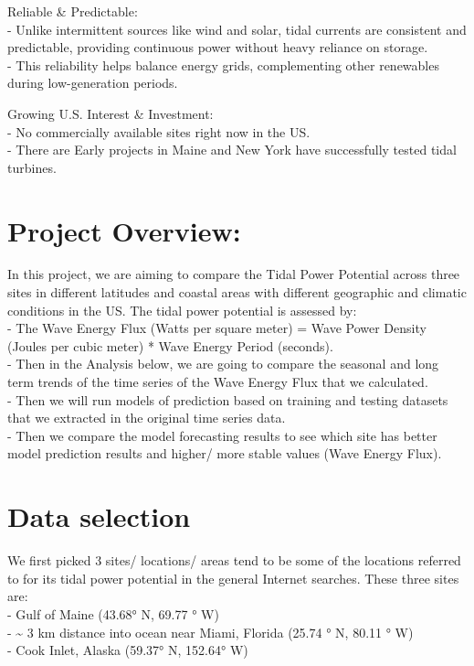 \documentclass[
]{article}
\begin{document}
Reliable \& Predictable:\\
- Unlike intermittent sources like wind and solar, tidal currents are
consistent and predictable, providing continuous power without heavy
reliance on storage.\\
- This reliability helps balance energy grids, complementing other
renewables during low-generation periods.

Growing U.S. Interest \& Investment:\\
- No commercially available sites right now in the US.\\
- There are Early projects in Maine and New York have successfully
tested tidal turbines.

\section{Project Overview:}\label{project-overview}

In this project, we are aiming to compare the Tidal Power Potential
across three sites in different latitudes and coastal areas with
different geographic and climatic conditions in the US. The tidal power
potential is assessed by:\\
- The Wave Energy Flux (Watts per square meter) = Wave Power Density
(Joules per cubic meter) * Wave Energy Period (seconds).\\
- Then in the Analysis below, we are going to compare the seasonal and
long term trends of the time series of the Wave Energy Flux that we
calculated.\\
- Then we will run models of prediction based on training and testing
datasets that we extracted in the original time series data.\\
- Then we compare the model forecasting results to see which site has
better model prediction results and higher/ more stable values (Wave
Energy Flux).

\section{Data selection}\label{data-selection}

We first picked 3 sites/ locations/ areas tend to be some of the
locations referred to for its tidal power potential in the general
Internet searches. These three sites are:\\
- Gulf of Maine (43.68° N, 69.77 ° W)\\
- \textasciitilde{} 3 km distance into ocean near Miami, Florida (25.74
° N, 80.11 ° W)\\
- Cook Inlet, Alaska (59.37° N, 152.64° W)
\end{document}
